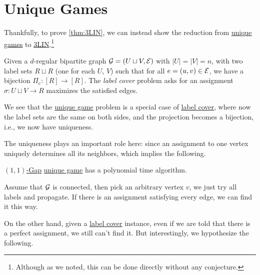 \section{Unique Games}
Thankfully, to prove \autoref{thm:3LIN}, we can instead show the reduction from \hyperref[prb:unique-game]{unique games} to \hyperref[prb:max-3LIN]{3LIN}.\footnote{Although as we noted, this can be done directly without any conjecture.}

\begin{problem}\label{prb:unique-game}
Given a \(d\)-regular bipartite graph \(\mathcal{\MakeUppercase{g}} =(U\sqcup V , \mathcal{\MakeUppercase{e}} )\) with \(\vert U \vert = \vert V \vert = n\), with two label sets \(R \sqcup R\) (one for each \(U\), \(V \)) such that for all \(e=(u, v)\in \mathcal{\MakeUppercase{e}} \), we have a bijection \(\Pi _e \colon [R]\to [R]\). The \emph{label cover} problem asks for an assignment \(\sigma\colon U \sqcup V \to R\) maximizes the satisfied edges.
\end{problem}

\begin{remark}
	We see that the \hyperref[prb:unique-game]{unique game} problem is a special case of \hyperref[prb:label-cover]{label cover}, where now the label sets are the same on both sides, and the projection becomes a bijection, i.e., we now have uniqueness.
\end{remark}

\begin{center}
\end{center}

The uniqueness plays an important role here: since an assignment to one vertex uniquely determines all its neighbors, which implies the following.
\begin{claim}
	\hyperref[def:c-s-Gap]{\((1, 1)\)-Gap} \hyperref[prb:unique-game]{unique game} has a polynomial time algorithm.
\end{claim}
\begin{explanation}
	Assume that \(\mathcal{\MakeUppercase{g}} \) is connected, then pick an arbitrary vertex \(v\), we just try all labels and propagate. If there is an assignment satisfying every edge, we can find it this way.
\end{explanation}

On the other hand, given a \hyperref[prb:label-cover]{label cover} instance, even if we are told that there is a perfect assignment, we still can't find it. But interestingly, we hypothesize the following.

